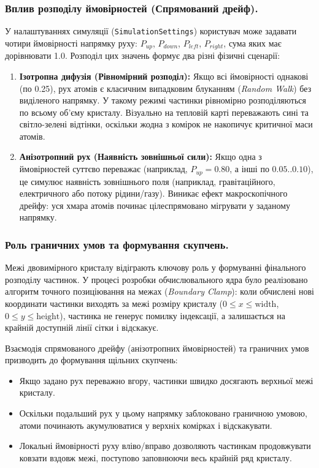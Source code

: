 \documentclass[14pt, a4paper]{extreport}
\begin{document}
	\subsubsection{Вплив розподілу ймовірностей (Спрямований дрейф).}
	
	У налаштуваннях симуляції (\texttt{SimulationSettings}) користувач може задавати чотири ймовірності напрямку руху: $P_{up}$, $P_{down}$, $P_{left}$, $P_{right}$, сума яких має дорівнювати 1.0. Розподіл цих значень формує два різні фізичні сценарії:
	
	\begin{enumerate}
		\item \textbf{Ізотропна дифузія (Рівномірний розподіл):} Якщо всі ймовірності однакові (по 0.25), рух атомів є класичним випадковим блуканням (\textit{Random Walk}) без виділеного напрямку. У такому режимі частинки рівномірно розподіляються по всьому об'єму кристалу. Візуально на тепловій карті переважають сині та світло-зелені відтінки, оскільки жодна з комірок не накопичує критичної маси атомів.
		
		\item \textbf{Анізотропний рух (Наявність зовнішньої сили):} Якщо одна з ймовірностей суттєво переважає (наприклад, $P_{up} = 0.80$, а інші по $0.05$..$0.10$), це симулює наявність зовнішнього поля (наприклад, гравітаційного, електричного або потоку рідини/газу). Виникає ефект макроскопічного дрейфу: уся хмара атомів починає цілеспрямовано мігрувати у заданому напрямку.
	\end{enumerate}
	
	\subsubsection{Роль граничних умов та формування скупчень.}
	
	Межі двовимірного кристалу відіграють ключову роль у формуванні фінального розподілу частинок. У процесі розробки обчислювального ядра було реалізовано алгоритм точного позиціювання на межах (\textit{Boundary Clamp}): коли обчислені нові координати частинки виходять за межі розміру кристалу ($0 \le x \le \text{width}$, $0 \le y \le \text{height}$), частинка не генерує помилку індексації, а залишається на крайній доступній лінії сітки і відскакує.
	
	Взаємодія спрямованого дрейфу (анізотропних ймовірностей) та граничних умов призводить до формування щільних скупчень:
	\begin{itemize}
		\item Якщо задано рух переважно вгору, частинки швидко досягають верхньої межі кристалу.
		\item Оскільки подальший рух у цьому напрямку заблоковано граничною умовою, атоми починають акумулюватися у верхніх комірках і відскакувати.
		\item Локальні ймовірності руху вліво/вправо дозволяють частинкам продовжувати ковзати вздовж межі, поступово заповнюючи весь крайній ряд кристалу.
	\end{itemize}
	
\end{document}
